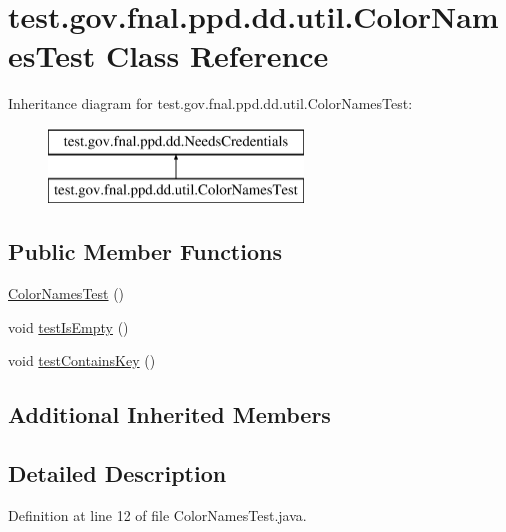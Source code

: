 \hypertarget{classtest_1_1gov_1_1fnal_1_1ppd_1_1dd_1_1util_1_1ColorNamesTest}{\section{test.\-gov.\-fnal.\-ppd.\-dd.\-util.\-Color\-Names\-Test Class Reference}
\label{classtest_1_1gov_1_1fnal_1_1ppd_1_1dd_1_1util_1_1ColorNamesTest}
}
Inheritance diagram for test.\-gov.\-fnal.\-ppd.\-dd.\-util.\-Color\-Names\-Test\-:\begin{figure}[H]
\begin{center}
\leavevmode
\includegraphics[height=2.000000cm]{classtest_1_1gov_1_1fnal_1_1ppd_1_1dd_1_1util_1_1ColorNamesTest}
\end{center}
\end{figure}
\subsection*{Public Member Functions}
\begin{DoxyCompactItemize}
\item 
\hyperlink{classtest_1_1gov_1_1fnal_1_1ppd_1_1dd_1_1util_1_1ColorNamesTest_a62dd90da3b7f55d614a1d0894738aeeb}{Color\-Names\-Test} ()
\item 
void \hyperlink{classtest_1_1gov_1_1fnal_1_1ppd_1_1dd_1_1util_1_1ColorNamesTest_aa399681fb14a75ae3c15495c64517128}{test\-Is\-Empty} ()
\item 
void \hyperlink{classtest_1_1gov_1_1fnal_1_1ppd_1_1dd_1_1util_1_1ColorNamesTest_a07a7f6fc63284f4f6eda2668cbf0e1e7}{test\-Contains\-Key} ()
\end{DoxyCompactItemize}
\subsection*{Additional Inherited Members}


\subsection{Detailed Description}


Definition at line 12 of file Color\-Names\-Test.\-java.



